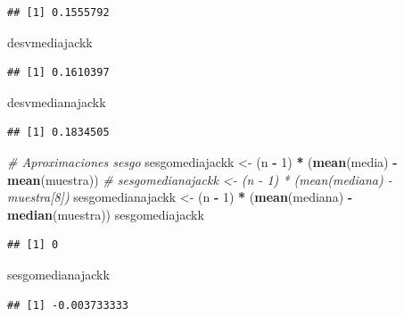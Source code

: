 \documentclass[]{book}
\newenvironment{Shaded}{\begin{snugshade}}{\end{snugshade}}
\newcommand{\KeywordTok}[1]{\textcolor[rgb]{0.13,0.29,0.53}{\textbf{#1}}}
\newcommand{\DecValTok}[1]{\textcolor[rgb]{0.00,0.00,0.81}{#1}}
\newcommand{\StringTok}[1]{\textcolor[rgb]{0.31,0.60,0.02}{#1}}
\newcommand{\CommentTok}[1]{\textcolor[rgb]{0.56,0.35,0.01}{\textit{#1}}}
\newcommand{\OperatorTok}[1]{\textcolor[rgb]{0.81,0.36,0.00}{\textbf{#1}}}
\newcommand{\NormalTok}[1]{#1}
\theoremstyle{definition}
\theoremstyle{definition}
\theoremstyle{definition}
\theoremstyle{remark}
\begin{document}
\begin{verbatim}
## [1] 0.1555792
\end{verbatim}

\begin{Shaded}
\begin{Highlighting}[]
\NormalTok{desvmediajackk}
\end{Highlighting}
\end{Shaded}

\begin{verbatim}
## [1] 0.1610397
\end{verbatim}

\begin{Shaded}
\begin{Highlighting}[]
\NormalTok{desvmedianajackk}
\end{Highlighting}
\end{Shaded}

\begin{verbatim}
## [1] 0.1834505
\end{verbatim}

\begin{Shaded}
\begin{Highlighting}[]
\CommentTok{# Aproximaciones sesgo}
\NormalTok{sesgomediajackk <-}\StringTok{ }\NormalTok{(n }\OperatorTok{-}\StringTok{ }\DecValTok{1}\NormalTok{) }\OperatorTok{*}\StringTok{ }\NormalTok{(}\KeywordTok{mean}\NormalTok{(media) }\OperatorTok{-}\StringTok{ }\KeywordTok{mean}\NormalTok{(muestra))}
\CommentTok{# sesgomedianajackk <- (n - 1) * (mean(mediana) - muestra[8])}
\NormalTok{sesgomedianajackk <-}\StringTok{ }\NormalTok{(n }\OperatorTok{-}\StringTok{ }\DecValTok{1}\NormalTok{) }\OperatorTok{*}\StringTok{ }\NormalTok{(}\KeywordTok{mean}\NormalTok{(mediana) }\OperatorTok{-}\StringTok{ }\KeywordTok{median}\NormalTok{(muestra))}
\NormalTok{sesgomediajackk}
\end{Highlighting}
\end{Shaded}

\begin{verbatim}
## [1] 0
\end{verbatim}

\begin{Shaded}
\begin{Highlighting}[]
\NormalTok{sesgomedianajackk}
\end{Highlighting}
\end{Shaded}

\begin{verbatim}
## [1] -0.003733333
\end{verbatim}
\end{document}
